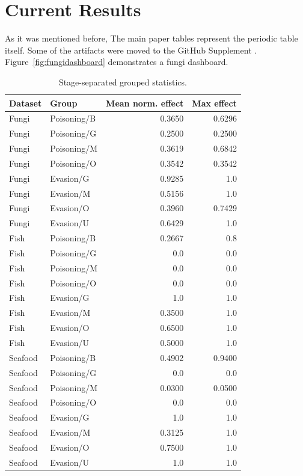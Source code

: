 \documentclass[conference]{IEEEtran}
\begin{document}
\section{Current Results}
As it was mentioned before, The main paper tables represent the periodic table itself. Some of the artifacts were moved to the GitHub Supplement 
\cite{KumarDataPoisonTable2026}.
Figure~\ref{fig:fungidashboard} demonstrates a fungi dashboard. 
\begin{table}[t]
\centering
\caption{Stage-separated grouped statistics. }
\label{tab:groupstats_supp_repeat}
\small
\begin{tabular}{llrr}
\toprule
Dataset & Group & Mean norm. effect & Max effect \\
\midrule
Fungi & Poisoning/B & 0.3650 & 0.6296 \\
Fungi & Poisoning/G & 0.2500 & 0.2500 \\
Fungi & Poisoning/M & 0.3619 & 0.6842 \\
Fungi & Poisoning/O & 0.3542 & 0.3542 \\
Fungi & Evasion/G & 0.9285 & 1.0 \\
Fungi & Evasion/M & 0.5156 & 1.0 \\
Fungi & Evasion/O & 0.3960 & 0.7429 \\
Fungi & Evasion/U & 0.6429 & 1.0 \\
Fish & Poisoning/B & 0.2667 & 0.8 \\
Fish & Poisoning/G & 0.0 & 0.0 \\
Fish & Poisoning/M & 0.0 & 0.0 \\
Fish & Poisoning/O & 0.0 & 0.0 \\
Fish & Evasion/G & 1.0 & 1.0 \\
Fish & Evasion/M & 0.3500 & 1.0 \\
Fish & Evasion/O & 0.6500 & 1.0 \\
Fish & Evasion/U & 0.5000 & 1.0 \\
Seafood & Poisoning/B & 0.4902 & 0.9400 \\
Seafood & Poisoning/G & 0.0 & 0.0 \\
Seafood & Poisoning/M & 0.0300 & 0.0500 \\
Seafood & Poisoning/O & 0.0 & 0.0 \\
Seafood & Evasion/G & 1.0 & 1.0 \\
Seafood & Evasion/M & 0.3125 & 1.0 \\
Seafood & Evasion/O & 0.7500 & 1.0 \\
Seafood & Evasion/U & 1.0 & 1.0 \\
\bottomrule
\end{tabular}
\end{table}
\end{document}
